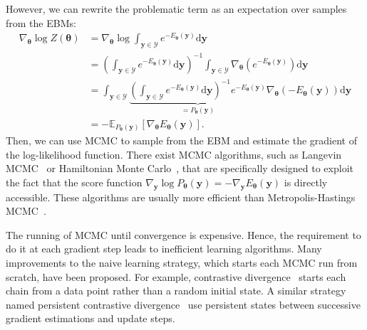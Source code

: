 However, we can rewrite the problematic term as an expectation over samples from the EBMs:
\begin{align}
\nabla_{\bm{\theta}} \log Z(\bm{\theta}) &= \nabla_{\bm{\theta}} \log \int_{\bm{y}\in \mathcal{Y}}e^{-E_{\bm{\theta}}(\bm{y})} \text{d}\bm{y}\\
&= \left( \int_{\bm{y}\in \mathcal{Y}}e^{-E_{\bm{\theta}}(\bm{y})} \text{d}\bm{y} \right)^{-1} \int_{\bm{y}\in \mathcal{Y}}
\nabla_{\bm{\theta}}\left( e^{-E_{\bm{\theta}}(\bm{y})}  \right) \text{d}\bm{y}\\
&= \int_{\bm{y}\in \mathcal{Y}} \underbrace{\left( \int_{\bm{y}\in \mathcal{Y}}e^{-E_{\bm{\theta}}(\bm{y})} \text{d}\bm{y} \right)^{-1}
e^{-E_{\bm{\theta}}(\bm{y})}}_{=P_{\bm{\theta}}(\bm{y})} \nabla_{\bm{\theta}}\left(-E_{\bm{\theta}}(\bm{y})\right) \text{d}\bm{y}\\
&= -\mathbb{E}_{P_{\bm{\theta}}(\bm{y})}\left[ \nabla_{\bm{\theta}}E_{\bm{\theta}}(\bm{y}) \right].
\end{align}
Then, we can use MCMC to sample from the EBM and estimate the gradient of the log-likelihood function. There exist MCMC algorithms, such as Langevin MCMC~\citep{parisi1981correlation, grenander1994representations} or Hamiltonian Monte Carlo~\citep{duane1987hybrid, neal2011mcmc}, that are specifically designed to exploit the fact that the score function $\nabla_{\bm{y}} \log P_{\bm{\theta}}(\bm{y}) = -\nabla_{\bm{y}} E_{\bm{\theta}}(\bm{y})$ is directly accessible. These algorithms are usually more efficient than Metropolis-Hastings MCMC~\citep{hastings1970monte}.

The running of MCMC until convergence is expensive. Hence, the requirement to do it at each gradient step leads to inefficient learning algorithms. Many improvements to the naive learning strategy, which starts each MCMC run from scratch, have been proposed. For example, contrastive divergence~\citep{hinton2002training} starts each chain from a data point rather than a random initial state. A similar strategy named persistent contrastive divergence~\citep{tieleman2008training} use persistent states between successive gradient estimations and update steps.
%

